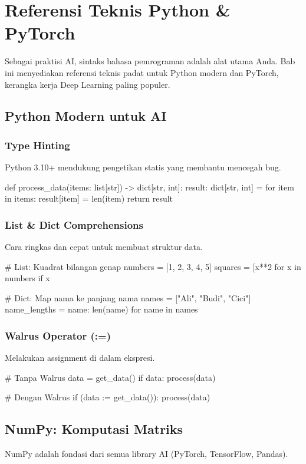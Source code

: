 \chapter{Referensi Teknis Python \& PyTorch}
\label{chap:tech_ref}

Sebagai praktisi AI, sintaks bahasa pemrograman adalah alat utama Anda. Bab ini menyediakan referensi teknis padat untuk Python modern dan PyTorch, kerangka kerja Deep Learning paling populer.

\section{Python Modern untuk AI}

\subsection{Type Hinting}
Python 3.10+ mendukung pengetikan statis yang membantu mencegah bug.
\begin{codeblock}[language=Python]
def process_data(items: list[str]) -> dict[str, int]:
    result: dict[str, int] = {}
    for item in items:
        result[item] = len(item)
    return result
\end{codeblock}

\subsection{List \& Dict Comprehensions}
Cara ringkas dan cepat untuk membuat struktur data.
\begin{codeblock}[language=Python]
# List: Kuadrat bilangan genap
numbers = [1, 2, 3, 4, 5]
squares = [x**2 for x in numbers if x %

# Dict: Map nama ke panjang nama
names = ["Ali", "Budi", "Cici"]
name_lengths = {name: len(name) for name in names}
\end{codeblock}

\subsection{Walrus Operator (:=)}
Melakukan assignment di dalam ekspresi.
\begin{codeblock}[language=Python]
# Tanpa Walrus
data = get_data()
if data:
    process(data)

# Dengan Walrus
if (data := get_data()):
    process(data)
\end{codeblock}

\section{NumPy: Komputasi Matriks}
NumPy adalah fondasi dari semua library AI (PyTorch, TensorFlow, Pandas).

